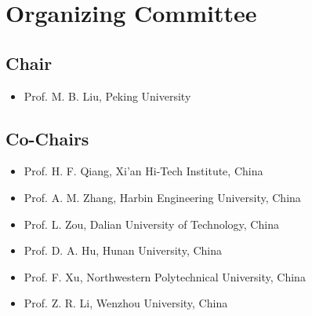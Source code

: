 \section*{Organizing Committee}
\subsection*{Chair}\vspace{-1em}
\begin{itemize}
\item Prof.   M. B. Liu, Peking University
\end{itemize}

\subsection*{Co-Chairs}\vspace{-1em}
\begin{itemize}
\item Prof.   H. F. Qiang, Xi'an Hi-Tech Institute, China
\item Prof.   A. M. Zhang, Harbin Engineering University, China
\item Prof.   L. Zou, Dalian University of Technology, China
\item Prof.   D. A. Hu, Hunan University, China
\item Prof.   F. Xu, Northwestern Polytechnical University, China
\item Prof.   Z. R. Li, Wenzhou University, China
\end{itemize}



